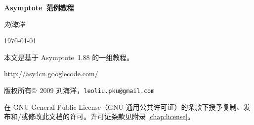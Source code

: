 \documentclass[cs4size,oneside,openany,nofonts,UTF8,CJKnormalspaces]
  {ctexbook}[2009/05/20]
\newcommand*\Asy{\textsf{Asymptote}}
\newcommand*\asyversion{1.88}
\begin{document}
\frontmatter

\begin{titlepage}
\begin{center}
  {\bfseries
  \Asy\ 范例教程}
\bigskip

  {\rmfamily\itshape
  刘海洋}
\bigskip

  {\today}
\end{center}
\end{titlepage}

\begingroup
\setlength{\parindent}{0pt}
本文是基于 \Asy\ \asyversion{} 的一组教程。

\url{http://asy4cn.googlecode.com/}
\medskip

版权所有\copyright\ 2009 刘海洋，\nolinkurl{leoliu.pku@gmail.com}

{\setlength{\leftskip}{2em}
在 GNU General Public License（GNU 通用公共许可证）的条款下授予复制、发布和/或修改此文档的许可。许可证条款见附录 \ref{chap:license}。\par}
\endgroup
\newpage

\tableofcontents

\mainmatter




\appendix


\printindex



\end{document}
